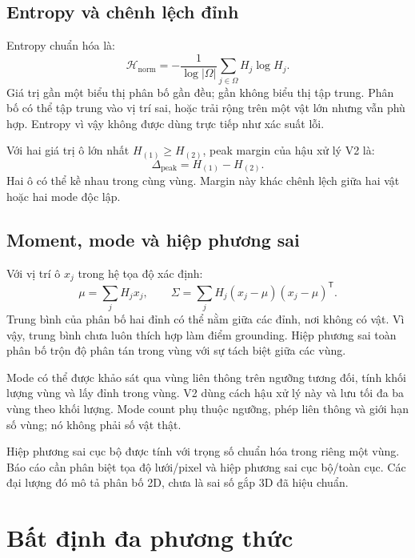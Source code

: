 \subsection{Entropy và chênh lệch đỉnh}

Entropy chuẩn hóa là:
\begin{equation}
    \mathcal{H}_{\mathrm{norm}}=
    -\frac{1}{\log|\Omega|}\sum_{j\in\Omega}H_j\log H_j.
    \label{eq:theory-entropy}
\end{equation}
Giá trị gần một biểu thị phân bố gần đều; gần không biểu thị tập trung. Phân bố có thể tập trung vào vị trí sai, hoặc trải rộng trên một vật lớn nhưng vẫn phù hợp. Entropy vì vậy không được dùng trực tiếp như xác suất lỗi.

Với hai giá trị ô lớn nhất $H_{(1)}\geq H_{(2)}$, peak margin của hậu xử lý V2 là:
\begin{equation}
    \Delta_{\mathrm{peak}}=H_{(1)}-H_{(2)}.
    \label{eq:theory-peak-margin}
\end{equation}
Hai ô có thể kề nhau trong cùng vùng. Margin này khác chênh lệch giữa hai vật hoặc hai mode độc lập.

\subsection{Moment, mode và hiệp phương sai}

Với vị trí ô $x_j$ trong hệ tọa độ xác định:
\begin{equation}
    \mu=\sum_jH_jx_j,\qquad
    \Sigma=\sum_jH_j(x_j-\mu)(x_j-\mu)^{\mathsf T}.
    \label{eq:theory-spatial-moments}
\end{equation}
Trung bình của phân bố hai đỉnh có thể nằm giữa các đỉnh, nơi không có vật. Vì vậy, trung bình chưa luôn thích hợp làm điểm grounding. Hiệp phương sai toàn phân bố trộn độ phân tán trong vùng với sự tách biệt giữa các vùng.

Mode có thể được khảo sát qua vùng liên thông trên ngưỡng tương đối, tính khối lượng vùng và lấy đỉnh trong vùng. V2 dùng cách hậu xử lý này và lưu tối đa ba vùng theo khối lượng. Mode count phụ thuộc ngưỡng, phép liên thông và giới hạn số vùng; nó không phải số vật thật.

Hiệp phương sai cục bộ được tính với trọng số chuẩn hóa trong riêng một vùng. Báo cáo cần phân biệt tọa độ lưới/pixel và hiệp phương sai cục bộ/toàn cục. Các đại lượng đó mô tả phân bố 2D, chưa là sai số gắp 3D đã hiệu chuẩn.

\section{Bất định đa phương thức}
\label{sec:theory-uncertainty}

